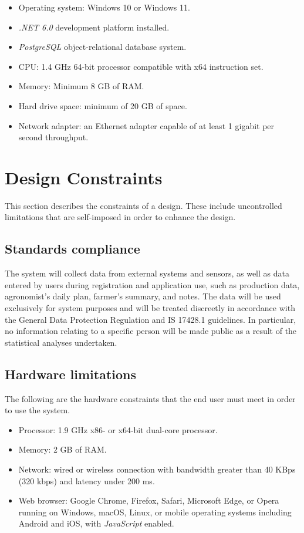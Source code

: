 \begin{itemize}
    \item Operating system: Windows 10 or Windows 11.    
    \item \textit{.NET 6.0} development platform installed.
    \item \textit{PostgreSQL} object-relational database system.
    \item CPU: 1.4 GHz 64-bit processor compatible with x64 instruction set.
    \item Memory: Minimum 8 GB of RAM. 
    \item Hard drive space: minimum of 20 GB of space.
    \item Network adapter: an Ethernet adapter capable of at least 1 gigabit per second throughput.
\end{itemize}

\section{Design Constraints}

This section describes the constraints of a design. These include uncontrolled limitations that are self-imposed in order to enhance the design.

\subsection{Standards compliance}

The system will collect data from external systems and sensors, as well as data entered by users during registration and application use, such as production data, agronomist's daily plan, farmer's summary, and notes. The data will be used exclusively for system purposes and will be treated discreetly in accordance with the General Data Protection Regulation \cite{GDPR} and IS 17428.1 \cite{india_privacy_doc} guidelines. In particular, no information relating to a specific person will be made public as a result of the statistical analyses undertaken.

\subsection{Hardware limitations}

The following are the hardware constraints that the end user must meet in order to use the system.

\begin{itemize}
    \item Processor: 1.9 GHz x86- or x64-bit dual-core processor.
    \item Memory: 2 GB of RAM.
    \item Network: wired or wireless connection with bandwidth greater than 40 KBps (320 kbps) and latency under 200 ms.
    \item Web browser: Google Chrome, Firefox, Safari, Microsoft Edge, or Opera running on Windows, macOS, Linux, or mobile operating systems including Android and iOS, with \textit{JavaScript} enabled.
\end{itemize}

